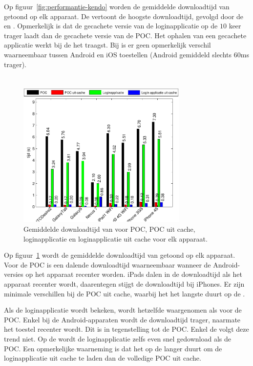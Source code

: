 Op figuur~\ref{fig:performantie-kendo} worden de gemiddelde downloadtijd van \kendo{} getoond op elk apparaat.
De \gtab{} vertoont de hoogste downloadtijd,  gevolgd door de \iphoneiii{} en \htc.
Opmerkelijk is dat de gecachete versie van de loginapplicatie op de \nexus{} $10$ keer trager laadt dan de gecachete versie van de POC.
Het ophalen van een gecachete applicatie werkt bij de \gs{} het traagst.
Bij \kendo{} is er geen opmerkelijk verschil waarneembaar tussen Android en iOS toestellen (Android gemiddeld slechts $60$ms trager).


\section*{\jqm}
\label{app:performantie-jqm}

\begin{figure}
  \centering
  \includegraphics[width=0.75\textwidth]{figuren/performance-jquery.pdf}
  \caption{Gemiddelde downloadtijd van \jqm{} voor POC,  POC uit cache, loginapplicatie en loginapplicatie uit cache voor elk apparaat.}
  \label{fig:performantie-jqm}
\end{figure}

Op figuur~\ref{fig:performantie-jqm} wordt de gemiddelde downloadtijd van \jqm{} getoond op elk apparaat.
Voor de POC is een dalende downloadtijd waarneembaar wanneer de Android-versies op het apparaat recenter worden.
iPads dalen in de downloadtijd als het apparaat recenter wordt, daarentegen stijgt de downloadtijd bij iPhones.
Er zijn minimale verschillen bij de POC uit cache, waarbij het het langste duurt op de \iphoneiv{}.

Als de loginapplicatie wordt bekeken, wordt hetzelfde waargenomen als voor de POC.
Enkel bij de Android-apparaten wordt de downloadtijd trager, naarmate het toestel recenter wordt. 
Dit is in tegenstelling tot de POC.
Enkel de \nexus{} volgt deze trend niet.
Op de \nexus{} wordt de loginapplicatie zelfs even snel gedownload als de POC.
Een opmerkelijke waarneming is dat het op de \nexus{} langer duurt om de loginapplicatie uit cache te laden dan de volledige POC uit cache.

